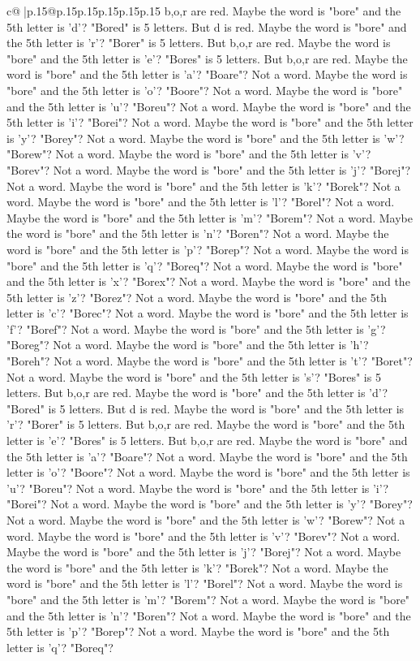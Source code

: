 \documentclass{article}
\begin{document}
{\begin{supertabular}{c@{$\;$}|p{.15\linewidth}@{}p{.15\linewidth}p{.15\linewidth}p{.15\linewidth}p{.15\linewidth}p{.15\linewidth}}
{{{b,o,r are red. Maybe the word is "bore" and the 5th letter is 'd'? "Bored" is 5 letters. But d is red. Maybe the word is "bore" and the 5th letter is 'r'? "Borer" is 5 letters. But b,o,r are red. Maybe the word is "bore" and the 5th letter is 'e'? "Bores" is 5 letters. But b,o,r are red. Maybe the word is "bore" and the 5th letter is 'a'? "Boare"? Not a word. Maybe the word is "bore" and the 5th letter is 'o'? "Boore"? Not a word. Maybe the word is "bore" and the 5th letter is 'u'? "Boreu"? Not a word. Maybe the word is "bore" and the 5th letter is 'i'? "Borei"? Not a word. Maybe the word is "bore" and the 5th letter is 'y'? "Borey"? Not a word. Maybe the word is "bore" and the 5th letter is 'w'? "Borew"? Not a word. Maybe the word is "bore" and the 5th letter is 'v'? "Borev"? Not a word. Maybe the word is "bore" and the 5th letter is 'j'? "Borej"? Not a word. Maybe the word is "bore" and the 5th letter is 'k'? "Borek"? Not a word. Maybe the word is "bore" and the 5th letter is 'l'? "Borel"? Not a word. Maybe the word is "bore" and the 5th letter is 'm'? "Borem"? Not a word. Maybe the word is "bore" and the 5th letter is 'n'? "Boren"? Not a word. Maybe the word is "bore" and the 5th letter is 'p'? "Borep"? Not a word. Maybe the word is "bore" and the 5th letter is 'q'? "Boreq"? Not a word. Maybe the word is "bore" and the 5th letter is 'x'? "Borex"? Not a word. Maybe the word is "bore" and the 5th letter is 'z'? "Borez"? Not a word. Maybe the word is "bore" and the 5th letter is 'c'? "Borec"? Not a word. Maybe the word is "bore" and the 5th letter is 'f'? "Boref"? Not a word. Maybe the word is "bore" and the 5th letter is 'g'? "Boreg"? Not a word. Maybe the word is "bore" and the 5th letter is 'h'? "Boreh"? Not a word. Maybe the word is "bore" and the 5th letter is 't'? "Boret"? Not a word. Maybe the word is "bore" and the 5th letter is 's'? "Bores" is 5 letters. But b,o,r are red. Maybe the word is "bore" and the 5th letter is 'd'? "Bored" is 5 letters. But d is red. Maybe the word is "bore" and the 5th letter is 'r'? "Borer" is 5 letters. But b,o,r are red. Maybe the word is "bore" and the 5th letter is 'e'? "Bores" is 5 letters. But b,o,r are red. Maybe the word is "bore" and the 5th letter is 'a'? "Boare"? Not a word. Maybe the word is "bore" and the 5th letter is 'o'? "Boore"? Not a word. Maybe the word is "bore" and the 5th letter is 'u'? "Boreu"? Not a word. Maybe the word is "bore" and the 5th letter is 'i'? "Borei"? Not a word. Maybe the word is "bore" and the 5th letter is 'y'? "Borey"? Not a word. Maybe the word is "bore" and the 5th letter is 'w'? "Borew"? Not a word. Maybe the word is "bore" and the 5th letter is 'v'? "Borev"? Not a word. Maybe the word is "bore" and the 5th letter is 'j'? "Borej"? Not a word. Maybe the word is "bore" and the 5th letter is 'k'? "Borek"? Not a word. Maybe the word is "bore" and the 5th letter is 'l'? "Borel"? Not a word. Maybe the word is "bore" and the 5th letter is 'm'? "Borem"? Not a word. Maybe the word is "bore" and the 5th letter is 'n'? "Boren"? Not a word. Maybe the word is "bore" and the 5th letter is 'p'? "Borep"? Not a word. Maybe the word is "bore" and the 5th letter is 'q'? "Boreq"? }}}
\end{supertabular}}
\end{document}
